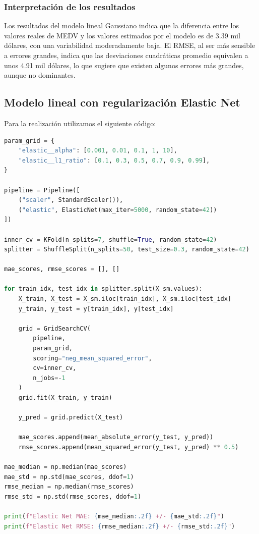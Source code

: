 \documentclass[12pt,a4paper]{article}
\begin{document}
\subsubsection{Interpretación de los resultados}

Los resultados del modelo lineal Gaussiano indica que la diferencia entre los valores reales de MEDV y los valores estimados por el modelo es de 3.39 mil dólares, con una variabilidad moderadamente baja.
El RMSE, al ser más sensible a errores grandes, indica que las desviaciones cuadráticas promedio equivalen a unos 4.91 mil dólares, lo que sugiere que existen algunos errores más grandes, aunque no dominantes.

\subsection{Modelo lineal con regularización Elastic Net}

Para la realización utilizamos el siguiente código:

\begin{lstlisting}[language=Python, frame=single, basicstyle=\ttfamily\small, breaklines=true]
param_grid = {
    "elastic__alpha": [0.001, 0.01, 0.1, 1, 10],
    "elastic__l1_ratio": [0.1, 0.3, 0.5, 0.7, 0.9, 0.99],
}

pipeline = Pipeline([
    ("scaler", StandardScaler()),
    ("elastic", ElasticNet(max_iter=5000, random_state=42))
])

inner_cv = KFold(n_splits=7, shuffle=True, random_state=42)
splitter = ShuffleSplit(n_splits=50, test_size=0.3, random_state=42)

mae_scores, rmse_scores = [], []

for train_idx, test_idx in splitter.split(X_sm.values):
    X_train, X_test = X_sm.iloc[train_idx], X_sm.iloc[test_idx]
    y_train, y_test = y[train_idx], y[test_idx]

    grid = GridSearchCV(
        pipeline,
        param_grid,
        scoring="neg_mean_squared_error",
        cv=inner_cv,
        n_jobs=-1
    )
    grid.fit(X_train, y_train)

    y_pred = grid.predict(X_test)

    mae_scores.append(mean_absolute_error(y_test, y_pred))
    rmse_scores.append(mean_squared_error(y_test, y_pred) ** 0.5)

mae_median = np.median(mae_scores)
mae_std = np.std(mae_scores, ddof=1)
rmse_median = np.median(rmse_scores)
rmse_std = np.std(rmse_scores, ddof=1)

print(f"Elastic Net MAE: {mae_median:.2f} +/- {mae_std:.2f}")
print(f"Elastic Net RMSE: {rmse_median:.2f} +/- {rmse_std:.2f}")
\end{lstlisting}
\end{document}
